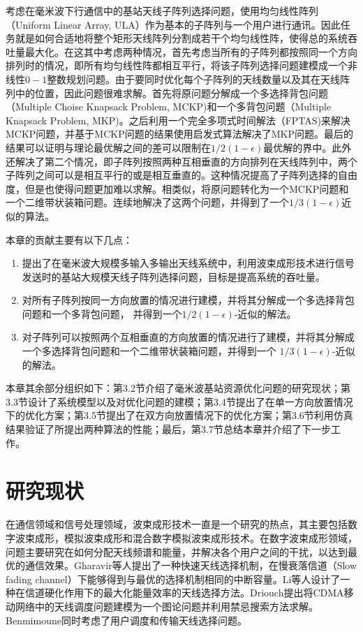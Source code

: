 考虑在毫米波下行通信中的基站天线子阵列选择问题，使用均匀线性阵列（Uniform Linear Array, ULA）作为基本的子阵列与一个用户进行通讯。因此任务就是如何合适地将整个矩形天线阵列分割成若干个均匀线性阵，使得总的系统吞吐量最大化。在这其中考虑两种情况，首先考虑当所有的子阵列都按照同一个方向排列时的情况，即所有均匀线性阵都相互平行，将该子阵列选择问题建模成一个非线性$0-1$整数规划问题。由于要同时优化每个子阵列的天线数量以及其在天线阵列中的位置，因此问题很难求解。首先将原问题分解成一个多选择背包问题（Multiple Choise Knapsack Problem, MCKP)和一个多背包问题（Multiple Knapsack Problem, MKP)。之后利用一个完全多项式时间解法（FPTAS)来解决MCKP问题，并基于MCKP问题的结果使用启发式算法解决了MKP问题。最后的结果可以证明与理论最优解之间的差可以限制在$1/2(1-\epsilon)$最优解的界中。此外还解决了第二个情况，即子阵列按照两种互相垂直的方向排列在天线阵列中，两个子阵列之间可以是相互平行的或是相互垂直的。这种情况提高了子阵列选择的自由度，但是也使得问题更加难以求解。相类似，将原问题转化为一个MCKP问题和一个二维带状装箱问题。连续地解决了这两个问题，并得到了一个$1/3(1-\epsilon)$近似的算法。

本章的贡献主要有以下几点：
\begin{enumerate}
\item 提出了在毫米波大规模多输入多输出天线系统中，利用波束成形技术进行信号发送时的基站大规模天线子阵列选择问题，目标是提高系统的吞吐量。

\item 对所有子阵列按同一方向放置的情况进行建模，并将其分解成一个多选择背包问题和一个多背包问题， 并得到一个$1/2(1-\epsilon)$-近似的解法。

\item 对子阵列可以按照两个互相垂直的方向放置的情况进行了建模，并将其分解成一个多选择背包问题和一个二维带状装箱问题，并得到一个 $1/3(1-\epsilon)$-近似的解法。
\end{enumerate}

本章其余部分组织如下：第3.2节介绍了毫米波基站资源优化问题的研究现状；第3.3节设计了系统模型以及对优化问题的建模；第3.4节提出了在单一方向放置情况下的优化方案；第3.5节提出了在双方向放置情况下的优化方案；第3.6节利用仿真结果验证了所提出两种算法的性能；最后，第3.7节总结本章并介绍了下一步工作。

\section{研究现状}

在通信领域和信号处理领域，波束成形技术\cite{gershman2010convex,muharar2011downlink,dimic2005downlink,zhou2015doa}一直是一个研究的热点，其主要包括数字波束成形，模拟波束成形和混合数字模拟波束成形技术。在数字波束成形领域，问题主要研究在如何分配天线频谱和能量，并解决各个用户之间的干扰，以达到最优的通信效果。Gharavir等人提出了一种快速天线选择机制\cite{gharavir2004selection}，在慢衰落信道（Slow fading channel）下能够得到与最优的选择机制相同的中断容量。Li等人设计了一种在信道硬化作用下的最大化能量效率的天线选择方法\cite{li2014energy}。Driouch提出将CDMA移动网络中的天线调度问题建模为一个图论问题并利用禁忌搜索方法求解\cite{driouch2012efficient}。Benmimoune同时考虑了用户调度和传输天线选择问题\cite{benmimoune2015joint}。

